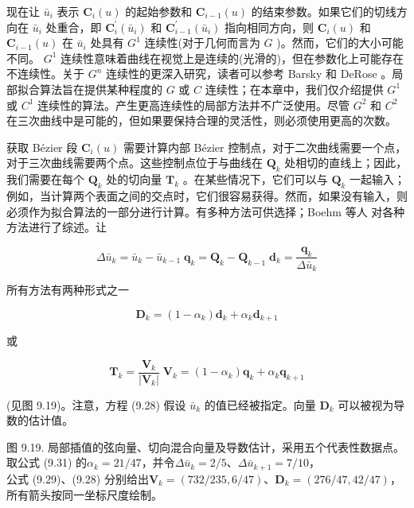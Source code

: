 \documentclass[../main.tex]{subfiles}
\begin{document}
现在让 \({\bar{u}}_{i}\) 表示 \({\mathbf{C}}_{i}\left( u\right)\) 的起始参数和 \({\mathbf{C}}_{i - 1}\left( u\right)\) 的结束参数。如果它们的切线方向在 \({\bar{u}}_{i}\) 处重合，即 \({\mathbf{C}}_{i}^{\prime }\left( {\bar{u}}_{i}\right)\) 和 \({\mathbf{C}}_{i - 1}^{\prime }\left( {\bar{u}}_{i}\right)\) 指向相同方向，则 \({\mathbf{C}}_{i}\left( u\right)\) 和 \({\mathbf{C}}_{i - 1}\left( u\right)\) 在 \({\bar{u}}_{i}\) 处具有 \({G}^{1}\) 连续性(对于几何而言为 \(G\) )。然而，它们的大小可能不同。 \({G}^{1}\) 连续性意味着曲线在视觉上是连续的(光滑的)，但在参数化上可能存在不连续性。关于 \({G}^{n}\) 连续性的更深入研究，读者可以参考 Barsky 和 DeRose \cite{Bars89,Bars90}。局部拟合算法旨在提供某种程度的 \(G\) 或 \(C\) 连续性；在本章中，我们仅介绍提供 \({G}^{1}\) 或 \({C}^{1}\) 连续性的算法。产生更高连续性的局部方法并不广泛使用。尽管 \({G}^{2}\) 和 \({C}^{2}\) 在三次曲线中是可能的，但如果要保持合理的灵活性，则必须使用更高的次数。





获取 Bézier 段 \({\mathbf{C}}_{i}\left( u\right)\) 需要计算内部 Bézier 控制点，对于二次曲线需要一个点，对于三次曲线需要两个点。这些控制点位于与曲线在 \({\mathbf{Q}}_{k}\) 处相切的直线上；因此，我们需要在每个 \({\mathbf{Q}}_{k}\) 处的切向量 \({\mathbf{T}}_{k}\) 。在某些情况下，它们可以与 \({\mathbf{Q}}_{k}\) 一起输入；例如，当计算两个表面之间的交点时，它们很容易获得。然而，如果没有输入，则必须作为拟合算法的一部分进行计算。有多种方法可供选择；Boehm 等人 \cite{Boeh84} 对各种方法进行了综述。让

\[
\Delta {\bar{u}}_{k} = {\bar{u}}_{k} - {\bar{u}}_{k - 1}\;{\mathbf{q}}_{k} = {\mathbf{Q}}_{k} - {\mathbf{Q}}_{k - 1}\;{\mathbf{d}}_{k} = \frac{{\mathbf{q}}_{k}}{\Delta {\bar{u}}_{k}}
\]

所有方法有两种形式之一

\[
{\mathbf{D}}_{k} = \left( {1 - {\alpha }_{k}}\right) {\mathbf{d}}_{k} + {\alpha }_{k}{\mathbf{d}}_{k + 1} \tag{9.28}
\]

或

\[
{\mathbf{T}}_{k} = \frac{{\mathbf{V}}_{k}}{\left| {\mathbf{V}}_{k}\right| }\;{\mathbf{V}}_{k} = \left( {1 - {\alpha }_{k}}\right) {\mathbf{q}}_{k} + {\alpha }_{k}{\mathbf{q}}_{k + 1} \tag{9.29}
\]

(见图 9.19)。注意，方程 (9.28) 假设 \({\bar{u}}_{k}\) 的值已经被指定。向量 \({\mathbf{D}}_{k}\) 可以被视为导数的估计值。





\begin{center}
\begin{minipage}{29cm}
\vspace*{.6\baselineskip}
\centering
{}
\par\smallskip
图 9.19. 局部插值的弦向量、切向混合向量及导数估计，采用五个代表性数据点。\\
取公式 (9.31) 的$\alpha_k=21/47$，并令$\Delta\bar u_k=2/5$、$\Delta\bar u_{k+1}=7/10$，\\
公式 (9.29)、(9.28) 分别给出$\mathbf V_k=(732/235,6/47)$、$\mathbf D_k=(276/47,42/47)$，所有箭头按同一坐标尺度绘制。
\end{minipage}
\end{center}
\end{document}
